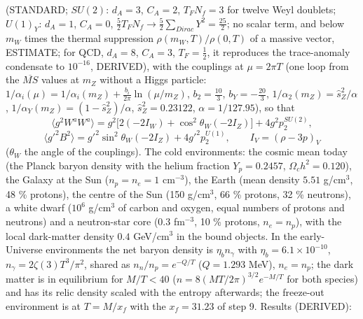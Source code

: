 \documentclass[
  10pt,
]{article}
\begin{document}
(STANDARD; \(SU(2)\): \(d_A = 3\), \(C_A = 2\), \(T_FN_f = 3\) for
twelve Weyl doublets; \(U(1)_Y\): \(d_A = 1\), \(C_A = 0\),
\(\frac52T_FN_f \to \frac52\sum_{Dirac}Y^2 = \frac{25}{2}\); no scalar
term, and below \(m_W\) times the thermal suppression
\(\rho(m_W, T)/\rho(0, T)\) of a massive vector, ESTIMATE; for QCD,
\(d_A = 8\), \(C_A = 3\), \(T_F = \frac12\), it reproduces the
trace-anomaly condensate to \(10^{-16}\), DERIVED), with the couplings
at \(\mu = 2\pi T\) (one loop from the \(\overline{MS}\) values at
\(m_Z\) without a Higgs particle:
\(1/\alpha_i(\mu) = 1/\alpha_i(m_Z) + \frac{b_i}{2\pi}\ln(\mu/m_Z)\),
\(b_2 = \frac{10}{3}\), \(b_Y = -\frac{20}{3}\),
\(1/\alpha_2(m_Z) = \hat s_Z^2/\alpha\),
\(1/\alpha_Y(m_Z) = (1 - \hat s_Z^2)/\alpha\), \(\hat s_Z^2 = 0.23122\),
\(\alpha = 1/127.95\)), so that
\[ \langle g^2W^aW^a\rangle = g^2\big[2(-2I_W) + \cos^2\theta_W(-2I_Z)\big] + 4g^2p_2^{SU(2)}, \]
\[ \langle g'^2B^2\rangle = g'^2\sin^2\theta_W(-2I_Z) + 4g'^2p_2^{U(1)},\qquad I_V = (\rho - 3p)_V \]
(\(\theta_W\) the angle of the couplings). The cold environments: the
cosmic mean today (the Planck baryon density with the helium fraction
\(Y_p = 0.2457\), \(\Omega_ch^2 = 0.120\)), the Galaxy at the Sun
(\(n_p = n_e = 1\) cm\(^{-3}\)), the Earth (mean density \(5.51\)
g/cm\(^3\), 48 \% protons), the centre of the Sun (150 g/cm\(^3\), 66 \%
protons, 32 \% neutrons), a white dwarf (\(10^6\) g/cm\(^3\) of carbon
and oxygen, equal numbers of protons and neutrons) and a neutron-star
core (\(0.3\) fm\(^{-3}\), 10 \% protons, \(n_e = n_p\)), with the local
dark-matter density \(0.4\) GeV/cm\(^3\) in the bound objects. In the
early-Universe environments the net baryon density is \(\eta_bn_\gamma\)
with \(\eta_b = 6.1\times10^{-10}\), \(n_\gamma = 2\zeta(3)T^3/\pi^2\),
shared as \(n_n/n_p = e^{-Q/T}\) (\(Q = 1.293\) MeV), \(n_e = n_p\); the
dark matter is in equilibrium for \(M/T < 40\)
(\(n = 8(MT/2\pi)^{3/2}e^{-M/T}\) for both species) and has its relic
density scaled with the entropy afterwards; the freeze-out environment
is at \(T = M/x_f\) with the \(x_f = 31.23\) of step 9. Results
(DERIVED):
\end{document}
